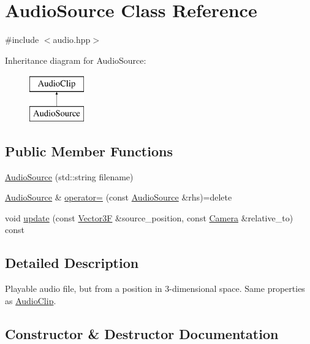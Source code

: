 \hypertarget{class_audio_source}{}\section{Audio\+Source Class Reference}
\label{class_audio_source}


{\ttfamily \#include $<$audio.\+hpp$>$}

Inheritance diagram for Audio\+Source\+:\begin{figure}[H]
\begin{center}
\leavevmode
\includegraphics[height=2.000000cm]{class_audio_source}
\end{center}
\end{figure}
\subsection*{Public Member Functions}
\begin{DoxyCompactItemize}
\item 
\mbox{\hyperlink{class_audio_source_a0cb3b38b2e113d9b8b86b4d9fd8046d8}{Audio\+Source}} (std\+::string filename)
\item 
\mbox{\hyperlink{class_audio_source}{Audio\+Source}} \& \mbox{\hyperlink{class_audio_source_aa73e35b3259f93e55a897b4c42e198d8}{operator=}} (const \mbox{\hyperlink{class_audio_source}{Audio\+Source}} \&rhs)=delete
\item 
void \mbox{\hyperlink{class_audio_source_acc045186f5f7516c3b71598f0b65b0c5}{update}} (const \mbox{\hyperlink{class_vector3}{Vector3F}} \&source\+\_\+position, const \mbox{\hyperlink{class_camera}{Camera}} \&relative\+\_\+to) const
\end{DoxyCompactItemize}


\subsection{Detailed Description}
Playable audio file, but from a position in 3-\/dimensional space. Same properties as \mbox{\hyperlink{class_audio_clip}{Audio\+Clip}}. 

\subsection{Constructor \& Destructor Documentation}
\mbox{\label{class_audio_source_a0cb3b38b2e113d9b8b86b4d9fd8046d8}} 
